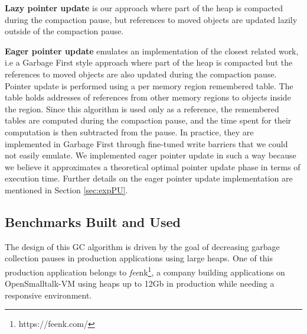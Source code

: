 \documentclass[sigplan,10pt,review,anonymous]{acmart}\settopmatter{printfolios=true,printccs=false,printacmref=false}
\def\feenk{\textit{fee}\textsf{nk}\xspace}
\def\OpenSmalltalkVM{OpenSmalltalk-VM\xspace}
\def\ie{\emph{i.e., }}
\begin{document}
\textbf{Lazy pointer update} is our approach where part of the heap is compacted during the compaction pause, but references to moved objects are updated lazily outside of the compaction pause. 

\textbf{Eager pointer update} emulates an implementation of the closest related work, i.e a Garbage First style approach where part of the heap is compacted but the references to moved objects are also updated during the compaction pause. Pointer update is performed using a per memory region remembered table. The table holds addresses of references from other memory regions to objects inside the region. Since this algorithm is used only as a reference, the remembered tables are computed during the compaction pause, and the time spent for their computation is then subtracted from the pause. In practice, they are implemented in Garbage First through fine-tuned write barriers that we could not easily emulate. We implemented eager pointer update in such a way because we believe it approximates a theoretical optimal pointer update phase in terms of execution time. %
Further details on the eager pointer update implementation are mentioned in Section \ref{sec:expPU}. 


\subsection{Benchmarks Built and Used}
The design of this GC algorithm is driven by the goal of decreasing garbage collection pauses in production applications using large heaps. One of this production application belongs to \feenk\footnote{https://feenk.com/}, a company building applications on \OpenSmalltalkVM using heaps up to 12Gb in production while needing a responsive environment. 
\end{document}
